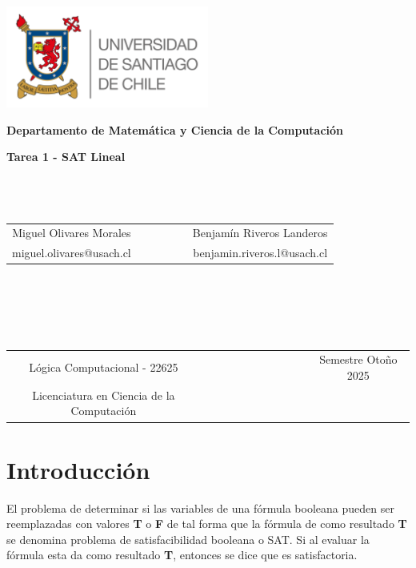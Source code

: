 \documentclass{report}
\begin{document}
	\begin{titlepage}
		\begin{center}
			\includegraphics[width=0.5\textwidth]{../Imagenes/LOGO-USACH_COLOR}
		\end{center}
		\begin{center}
			{\bf Departamento de Matem\'atica y Ciencia de la Computaci\'on}
		\end{center}
		\vspace{3cm}
		\begin{center}
			{\Large \bf Tarea 1 - SAT Lineal}
			~ \\ 
			~ \\ 
			~ \\
			~ \\
			\begin{tabular}{c c c}
				Miguel Olivares Morales & ~~~~~~~ & Benjam\'in Riveros Landeros \\
				miguel.olivares@usach.cl & & benjamin.riveros.l@usach.cl \\
			\end{tabular}
			~ \\ 
			~ \\ 
			~ \\
			~ \\
			\begin{tabular}{c c c}
				L\'ogica Computacional - 22625 & ~~~~~~~~~~~~~~~~~ & Semestre Oto\~no 2025 \\
				Licenciatura en Ciencia de la Computaci\'on & &  \\
			\end{tabular}
		\end{center}
	\end{titlepage}
	
	\section{Introducci\'on}
	El problema de determinar si las variables de una f\'ormula booleana pueden ser reemplazadas con valores \textbf{T} o \textbf{F} de tal forma que la f\'ormula de como resultado \textbf{T} se denomina problema de satisfacibilidad booleana o SAT. Si al evaluar la f\'ormula esta da como resultado \textbf{T}, entonces se dice que es satisfactoria.
\end{document}
